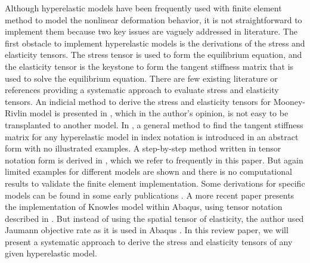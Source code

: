 Although hyperelastic models have been frequently used with finite element method to model the nonlinear deformation behavior, it is not straightforward to implement them because two key issues are vaguely addressed in literature. The first obstacle to implement hyperelastic models is the derivations of the stress and elasticity tensors. The stress tensor is used to form the equilibrium equation, and the elasticity tensor is the keystone to form the tangent stiffness matrix that is used to solve the equilibrium equation. There are few existing literature or references providing a systematic approach to evaluate stress and elasticity tensors. An indicial method to derive the stress and elasticity tensors for Mooney-Rivlin model is presented in \cite{Bower}, which in the author's opinion, is not easy to be transplanted to another model. In \cite{Belytschko}, a general method to find the tangent stiffness matrix for any hyperelastic model in index notation is introduced in an abstract form with no illustrated examples. A step-by-step method written in tensor notation form is derived in \cite{Holzapfel}, which we refer to frequently in this paper. But again limited examples for different models are shown and there is no computational results to validate the finite element implementation. Some derivations for specific models can be found in some early publications \cite{Weiss, Nicholson}. A more recent paper \cite{Suchocki} presents the implementation of Knowles model within Abaqus, using tensor notation described in \cite{Holzapfel}. But instead of using the spatial tensor of elasticity, the author used Jaumann objective rate as it is used in Abaqus \cite{Abaqus}. In this review paper, we will present a systematic approach to derive the stress and elasticity tensors of any given hyperelastic model.


